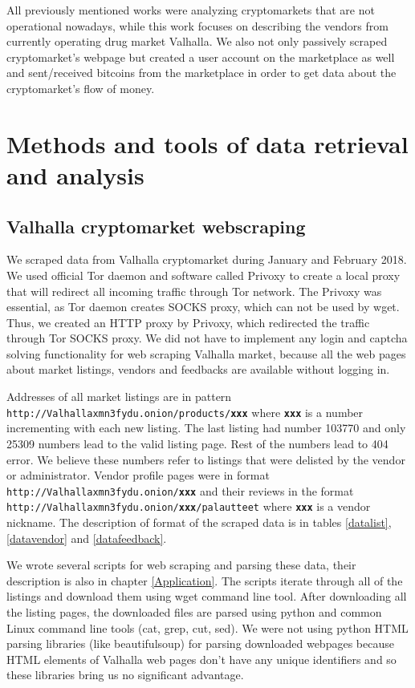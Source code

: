 \documentclass[
  digital, %
  table,   %
  lof,     %
  lot,     %
  oneside
]{fithesis3}
\begin{document}
 All previously mentioned works were analyzing cryptomarkets that are not operational nowadays,
 while this work focuses on describing the vendors from currently operating drug market Valhalla. We also not only passively scraped cryptomarket's webpage but created a user account on the marketplace as well and sent/received bitcoins from the marketplace in order to get data about the cryptomarket's flow of money.
 
\chapter{Methods and tools of data retrieval and analysis}
\section{Valhalla cryptomarket webscraping}
\label{Valhalla cryptomarket webscraping}
We scraped data from Valhalla cryptomarket
during January and February 2018. 
We used official Tor daemon and software called Privoxy to create a local proxy that will redirect all
incoming traffic through Tor network. The Privoxy was essential, as Tor daemon creates SOCKS proxy,
which can not be used by wget. Thus, we created an HTTP proxy by Privoxy,
which redirected the traffic through Tor SOCKS proxy.
We did not have to implement any login and captcha solving functionality
for web scraping Valhalla market, because all the web pages about market
listings, vendors and feedbacks are available without logging in.

Addresses of all market listings are in pattern\newline
\texttt{http://Valhallaxmn3fydu.onion/products/\textbf{xxx}} where \texttt{\textbf{xxx}}
is a number incrementing with each new listing.
The last listing had number 103770 and only 25309 numbers lead to the valid listing page.
Rest of the numbers lead to 404 error. We believe
these numbers refer to listings that were delisted by the vendor or administrator.
Vendor profile pages were in format \texttt{http://Valhallaxmn3fydu.onion/\textbf{xxx}}
and their reviews in the format
 \texttt{http://Valhallaxmn3fydu.onion/\textbf{xxx}/palautteet} where \texttt{\textbf{xxx}}
is a vendor nickname. The description of format of the scraped data is in tables \ref{datalist}, \ref{datavendor} and \ref{datafeedback}.

We wrote several scripts for web scraping and parsing these data, 
their description is also in chapter \ref{Application}.
The scripts iterate through all of the listings
and download them using wget command line tool.
After downloading all the listing pages,
the downloaded files are parsed using python and common Linux command line tools (cat, grep, cut, sed).
We were not using python HTML parsing libraries (like beautifulsoup) for parsing downloaded
webpages because HTML elements of Valhalla web pages don't have any unique identifiers
and so these libraries bring us no significant advantage.
 
\end{document}
